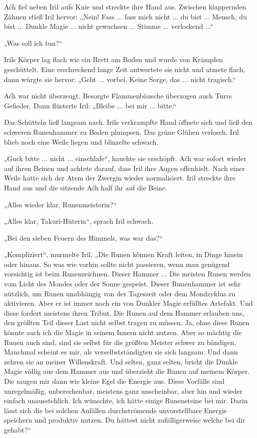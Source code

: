 Aćh fiel neben Iril aufs Knie und streckte ihre Hand aus. Zwischen klappernden Zähnen stieß Iril hervor: „Nein! Fass ... fass mich nicht ... du bist ... Mensch, du bist ... Dunkle Magie ... nicht gewachsen ... Stimme ... verlockend ...“

„Was soll ich tun?“

Irils Körper lag flach wie ein Brett am Boden und wurde von Krämpfen geschüttelt. Eine erschreckend lange Zeit antwortete sie nicht und atmete flach, dann würgte sie hervor: „Geht ... vorbei. Keine Sorge, das ... nicht tragisch.“

Aćh war nicht überzeugt. Besorgte Flammenbäusche überzogen auch Turrs Gefieder. Dann flüsterte Iril: „Bleibe ... bei mir ... bitte.“

Das Schütteln ließ langsam nach. Irils verkrampfte Hand öffnete sich und ließ den schweren Runenhammer zu Boden plumpsen. Das grüne Glühen verlosch. Iril blieb noch eine Weile liegen und blinzelte schwach.

„Guck bitte ... nicht ... einschlafe“, hauchte sie erschöpft. Aćh war sofort wieder auf ihren Beinen und achtete darauf, dass Iril ihre Augen offenhielt. Nach einer Weile hatte sich der Atem der Zwergin wieder normalisiert. Iril streckte ihre Hand aus und die sitzende Aćh half ihr auf die Beine.

„Alles wieder klar, Runenmeisterin?“

„Alles klar, Takuri-Hüterin“, sprach Iril schwach.

„Bei den sieben Feuern des Himmels, was war das?“

„Kompliziert“, murmelte Iril, „Die Runen können Kraft leiten, in Dinge hinein oder hinaus. So was wie vorhin sollte nicht passieren, wenn man genügend vorsichtig ist beim Runenzeichnen. Dieser Hammer ... Die meisten Runen werden vom Licht des Mondes oder der Sonne gespeist. Dieser Runenhammer ist sehr nützlich, um Runen unabhängig von der Tageszeit oder dem Mondzyklus zu aktivieren. Aber er ist immer noch ein von Dunkler Magie erfülltes Artefakt. Und diese fordert meistens ihren Tribut. Die Runen auf dem Hammer erlauben uns, den größten Teil dieser Last nicht selbst tragen zu müssen. Ja, ohne diese Runen könnte auch ich die Magie in seinem Innern nicht nutzen. Aber so mächtig die Runen auch sind, sind sie selbst für die größten Meister schwer zu bändigen. Manchmal scheint es mir, als verselbstständigten sie sich langsam. Und dann zehren sie an meiner Willenskraft. Und selten, ganz selten, bricht die Dunkle Magie völlig aus dem Hammer aus und überzieht die Runen auf meinem Körper. Die saugen mir dann wie kleine Egel die Energie aus. Diese Vorfälle sind unregelmäßig, unberechenbar, meistens ganz unscheinbar, aber hin und wieder einfach unausstehlich. Ich wünschte, ich hätte einige Runensteine bei mir. Darin lässt sich die bei solchen Anfällen durchströmende unvorstellbare Energie speichern und produktiv nutzen. Du hättest nicht zufälligerweise welche bei dir gehabt?“

